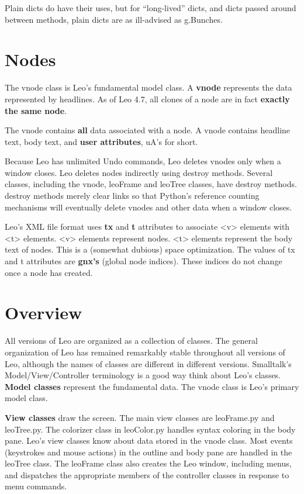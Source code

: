 \documentclass[a4paper,10pt,english]{sphinxmanual}
\begin{document}
Plain dicts do have their uses, but for ``long-lived'' dicts,
and dicts passed around between methods, plain dicts are as
ill-advised as g.Bunches.


\section{Nodes}
\label{theory:nodes}
The vnode class is Leo's fundamental model class. A \textbf{vnode} represents the
data represented by headlines. As of Leo 4.7, all clones of a node are in fact
\textbf{exactly the same node}.

The vnode contains \textbf{all} data associated with a node. A vnode contains
headline text, body text, and \textbf{user attributes}, uA's for short.

Because Leo has unlimited Undo commands, Leo deletes vnodes only when a window
closes. Leo deletes nodes indirectly using destroy methods. Several classes,
including the vnode, leoFrame and leoTree classes, have destroy methods. destroy
methods merely clear links so that Python's reference counting mechanisms will
eventually delete vnodes and other data when a window closes.

Leo's XML file format uses \textbf{tx} and \textbf{t} attributes to associate \textless{}v\textgreater{} elements
with \textless{}t\textgreater{} elements. \textless{}v\textgreater{} elements represent nodes. \textless{}t\textgreater{} elements represent the body
text of nodes. This is a (somewhat dubious) space optimization. The values of tx
and t attributes are \textbf{gnx's} (global node indices). These indices do not
change once a node has created.


\section{Overview}
\label{theory:overview}
All versions of Leo are organized as a collection of classes. The general
organization of Leo has remained remarkably stable throughout all versions of
Leo, although the names of classes are different in different versions.
Smalltalk's Model/View/Controller terminology is a good way think about Leo's
classes. \textbf{Model classes} represent the fundamental data. The vnode
class is Leo's primary model class.

\textbf{View classes} draw the screen. The main view classes are leoFrame.py and
leoTree.py. The colorizer class in leoColor.py handles syntax coloring in the
body pane. Leo's view classes know about data stored in the vnode class. Most
events (keystrokes and mouse actions) in the outline and body pane are handled
in the leoTree class. The leoFrame class also creates the Leo window, including
menus, and dispatches the appropriate members of the controller classes in
response to menu commands.
\end{document}

